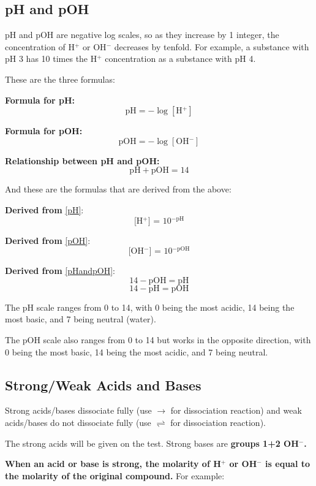 \documentclass[a4paper, 12pt]{article}
\begin{document}
\subsection*{pH and pOH}
pH and pOH are negative log scales, so as they increase by 1 integer, the concentration of H$^+$ or OH$^-$ decreases by tenfold. For example, a substance with pH 3 has 10 times the H$^+$ concentration as a substance with pH 4.

These are the three formulas:

\textbf{Formula for pH:}
\begin{equation}\label{pH}
    \text{pH} = -\log[\text{H$^+$}]
\end{equation}

\textbf{Formula for pOH:}
\begin{equation}\label{pOH}
\text{pOH} = -\log[\text{OH$^-$}]
\end{equation}

\textbf{Relationship between pH and pOH:}
\begin{equation}\label{pHandpOH}
    \text{pH} + \text{pOH} = 14
\end{equation}

And these are the formulas that are derived from the above:

\textbf{Derived from} \ref{pH}:
$$ \text{[H$^+$] = 10$^{-\text{pH}}$}$$

\textbf{Derived from} \ref{pOH}:
$$ \text{[OH$^-$] = 10$^{-\text{pOH}}$}$$

\textbf{Derived from} \ref{pHandpOH}:
$$14 - \text{pOH} = \text{pH}$$
$$14 - \text{pH} = \text{pOH} $$

The pH scale ranges from 0 to 14, with 0 being the most acidic, 14 being the most basic, and 7 being neutral (water).

The pOH scale also ranges from 0 to 14 but works in the opposite direction, with 0 being the most basic, 14 being the most acidic, and 7 being neutral.

\subsection*{Strong/Weak Acids and Bases}
Strong acids/bases dissociate fully (use $\longrightarrow$ for dissociation reaction) and weak acids/bases do not dissociate fully (use $\rightleftharpoons$ for dissociation reaction).

The strong acids will be given on the test. Strong bases are \textbf{groups 1+2 OH$^-$.}

\textbf{When an acid or base is strong, the molarity of H$^+$ or OH$^-$ is equal to the molarity of the original compound.} For example:
\end{document}
